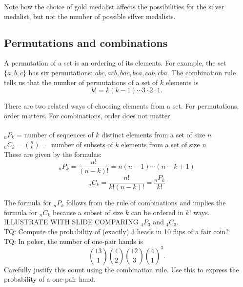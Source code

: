 \documentclass[12pt]{article}
\begin{document}
Note how the choice of gold medalist affects the possibilities for the silver medalist, but not the number of possible silver medalists.


\subsection{Permutations and combinations}

A permutation of a set is an ordering of its elements.  For example, the set $\{a,b,c\}$ has six permutations: $abc, acb, bac, bca, cab, cba$. The combination rule tells us that the number of permutations of a set of $k$ elements is $$k! = k(k-1)\cdots 3 \cdot 2 \cdot 1.$$

There are two related ways of choosing elements from a set.  For permutations, order matters.  For combinations, order does not matter:  \\ \\
$_nP_k$ = number of sequences of $k$ distinct elements from a set of size $n$ \\
$_nC_k = \binom{n}{k} =$ number of subsets of $k$ elements from a set of size $n$ \\

These are given by the formulas:
$$_nP_k = \frac{n!}{(n-k)!} = n (n-1) \cdots (n-k+1)$$
$$_nC_k = \frac{n!}{k!(n-k)!} = \frac{_nP_k}{k!}$$

The formula for $_nP_k$ follows from the rule of combinations and implies the formula for $_nC_k$ because a subset of size $k$ can be ordered in $k!$ ways. \\

ILLUSTRATE WITH SLIDE COMPARING $_4P_3$ and $_4C_3$. \\



TQ: Compute the probability of (exactly) 3 heads in 10 flips of a fair coin?\\

TQ: In poker, the number of one-pair hands is
$$\binom{13}{1}\binom{4}{2}\binom{12}{3}\binom{4}{1}^3.$$
Carefully justify this count using the combination rule.  Use this to express the probability of a one-pair hand. \\
\end{document}
